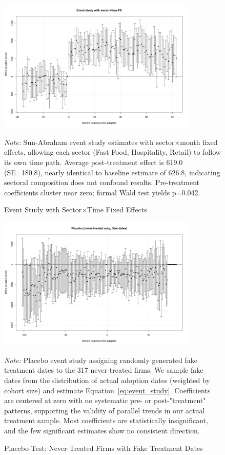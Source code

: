 \documentclass{article}
\begin{document}
\begin{figure}[H]
\centering
\includegraphics[width=0.85\textwidth]{es_sales_sector_time.png}
\caption{Event Study with Sector$\times$Time Fixed Effects}
\label{fig:es_sector_time}
\vspace{-0.5em}
{\small \textit{Note:} Sun-Abraham event study estimates with sector$\times$month fixed effects, allowing each sector (Fast Food, Hospitality, Retail) to follow its own time path. Average post-treatment effect is 619.0 (SE=180.8), nearly identical to baseline estimate of 626.8, indicating sectoral composition does not confound results. Pre-treatment coefficients cluster near zero; formal Wald test yields p=0.042.}
\end{figure}

\begin{figure}[H]
\centering
\includegraphics[width=0.85\textwidth]{es_sales_placebo.png}
\caption{Placebo Test: Never-Treated Firms with Fake Treatment Dates}
\label{fig:placebo}
\vspace{-0.5em}
{\small \textit{Note:} Placebo event study assigning randomly generated fake treatment dates to the 317 never-treated firms. We sample fake dates from the distribution of actual adoption dates (weighted by cohort size) and estimate Equation~\ref{eq:event_study}. Coefficients are centered at zero with no systematic pre- or post-"treatment" patterns, supporting the validity of parallel trends in our actual treatment sample. Most coefficients are statistically insignificant, and the few significant estimates show no consistent direction.}
\end{figure}
\end{document}
